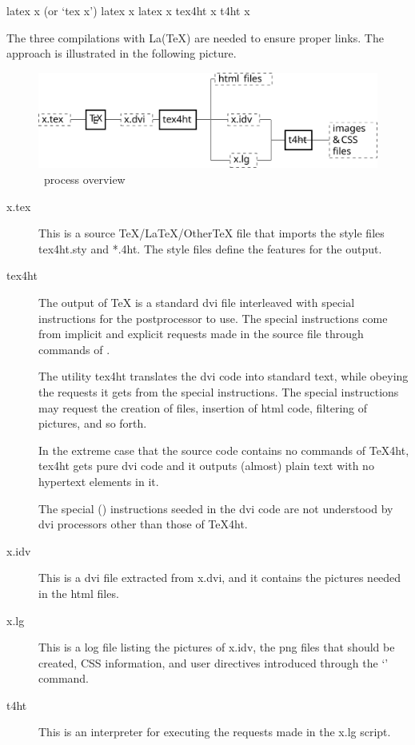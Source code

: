 \begin{shellcommand}
latex      x            (or ‘tex x’) 
latex      x 
latex      x 
tex4ht     x 
t4ht       x 
\end{shellcommand}

The three compilations with La(TeX) are needed to ensure proper links. The approach is illustrated in the following picture. 

\begin{figure}
  \includegraphics{images/tex4ht_process/tex4ht_process}
  \caption{\texfourht\ process overview}
\end{figure}

\begin{description}
  \item[x.tex]

This is a source TeX/LaTeX/OtherTeX file that imports the style files tex4ht.sty and *.4ht. The style files define the features for the output.

\item[tex4ht]

The output of \TeX{} is a standard dvi file interleaved with special
instructions for the postprocessor  to use. The special
instructions come from implicit and explicit requests made in the source file
through commands of \texfourht.

The utility tex4ht translates the dvi code into standard text, while obeying
the requests it gets from the special instructions. The special instructions
may request the creation of files, insertion of html code, filtering of
pictures, and so forth.

In the extreme case that the source code contains no commands of TeX4ht, tex4ht
gets pure dvi code and it outputs (almost) plain text with no hypertext
elements in it.

The special (\texcommand{\special}) instructions seeded in the dvi code are not understood
by dvi processors other than those of TeX4ht.

\item[x.idv]

This is a dvi file extracted from x.dvi, and it contains the pictures needed in
the html files.

\item[x.lg]

This is a log file listing the pictures of x.idv, the png files that should be
created, CSS information, and user directives introduced through the
‘’ command.

\item[t4ht]
This is an interpreter for executing the requests made in the x.lg script.

\end{description}


